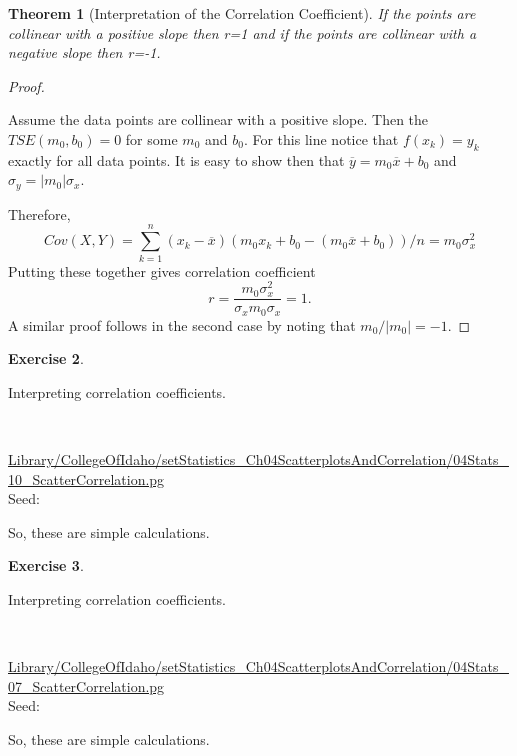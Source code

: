 \documentclass[10pt,]{book}
\theoremstyle{plain}
\newtheorem{theorem}{Theorem}[section]
\theoremstyle{definition}
\theoremstyle{definition}
\theoremstyle{definition}
\newtheorem{exercise}[theorem]{Exercise}
\numberwithin{equation}{section}
\begin{document}
\begin{theorem}[{Interpretation of the Correlation Coefficient}]\label{theorem-3}
If the points are collinear with a positive slope then r=1 and if the points are collinear with a negative slope then r=-1.\end{theorem}
\begin{proof}\hypertarget{proof-3}{}

Assume the data points are collinear with a positive slope. Then the 
\(TSE(m_0,b_0) = 0\) for some \(m_0\) and \(b_0\). For this line notice that \(f(x_k) = y_k\) exactly for all data points. It is easy to show then that \(\overline{y} = m_0 \overline{x} + b_0\) and \(\sigma_y = | m_0 | \sigma_x\).

Therefore,
\begin{equation*}Cov(X,Y) = \sum_{k=1}^n (x_k-\overline{x})(m_0 x_k + b_0 - (m_0 \overline{x} + b_0))/n = m_0 \sigma_x^2\end{equation*}
Putting these together gives correlation coefficient
\begin{equation*}r = \frac{m_0 \sigma_x^2}{\sigma_x m_0 \sigma_x} = 1.\end{equation*} 
A similar proof follows in the second case by noting that \(m_0 / | m_0 | = -1\).
%
\end{proof}


\begin{exercise}\label{exercise-7}

		Interpreting correlation coefficients.
\par\medskip
\mbox{}\\ %
\begin{mdframed}
{}\par\vspace*{2ex}%
{\tiny\ttfamily\noindent\url{Library/CollegeOfIdaho/setStatistics_Ch04ScatterplotsAndCorrelation/04Stats_10_ScatterCorrelation.pg}\\Seed: \hfill}\end{mdframed}
\medskip\noindent 
		So, these are simple calculations.
\par
\end{exercise}


\begin{exercise}\label{exercise-8}

		Interpreting correlation coefficients.
\par\medskip
\mbox{}\\ %
\begin{mdframed}
{}\par\vspace*{2ex}%
{\tiny\ttfamily\noindent\url{Library/CollegeOfIdaho/setStatistics_Ch04ScatterplotsAndCorrelation/04Stats_07_ScatterCorrelation.pg}\\Seed: \hfill}\end{mdframed}
\medskip\noindent 
		So, these are simple calculations.
\par
\end{exercise}
\end{document}
